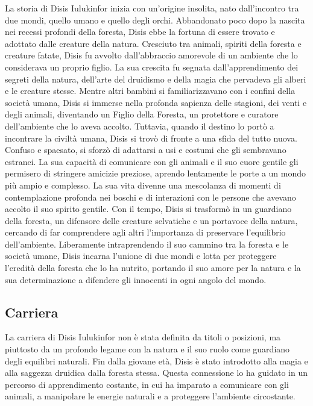La storia di Disis Iulukinfor inizia con un'origine insolita, nato
dall'incontro tra due mondi, quello umano e quello degli orchi.
Abbandonato poco dopo la nascita nei recessi profondi della foresta,
Disis ebbe la fortuna di essere trovato e adottato dalle creature della
natura. Cresciuto tra animali, spiriti della foresta e creature fatate,
Disis fu avvolto dall'abbraccio amorevole di un ambiente che lo
considerava un proprio figlio. La sua crescita fu segnata
dall'apprendimento dei segreti della natura, dell'arte del druidismo e
della magia che pervadeva gli alberi e le creature stesse. Mentre altri
bambini si familiarizzavano con i confini della società umana, Disis si
immerse nella profonda sapienza delle stagioni, dei venti e degli
animali, diventando un Figlio della Foresta, un protettore e curatore
dell'ambiente che lo aveva accolto. Tuttavia, quando il destino lo portò
a incontrare la civiltà umana, Disis si trovò di fronte a una sfida del
tutto nuova. Confuso e spaesato, si sforzò di adattarsi a usi e costumi
che gli sembravano estranei. La sua capacità di comunicare con gli
animali e il suo cuore gentile gli permisero di stringere amicizie
preziose, aprendo lentamente le porte a un mondo più ampio e complesso.
La sua vita divenne una mescolanza di momenti di contemplazione profonda
nei boschi e di interazioni con le persone che avevano accolto il suo
spirito gentile. Con il tempo, Disis si trasformò in un guardiano della
foresta, un difensore delle creature selvatiche e un portavoce della
natura, cercando di far comprendere agli altri l'importanza di
preservare l'equilibrio dell'ambiente. Liberamente intraprendendo il suo
cammino tra la foresta e le società umane, Disis incarna l'unione di due
mondi e lotta per proteggere l'eredità della foresta che lo ha nutrito,
portando il suo amore per la natura e la sua determinazione a difendere
gli innocenti in ogni angolo del mondo.

\subsection{Carriera}\label{carriera}


La carriera di Disis Iulukinfor non è stata definita da titoli o
posizioni, ma piuttosto da un profondo legame con la natura e il suo
ruolo come guardiano degli equilibri naturali. Fin dalla giovane età,
Disis è stato introdotto alla magia e alla saggezza druidica dalla
foresta stessa. Questa connessione lo ha guidato in un percorso di
apprendimento costante, in cui ha imparato a comunicare con gli animali,
a manipolare le energie naturali e a proteggere l'ambiente circostante.

